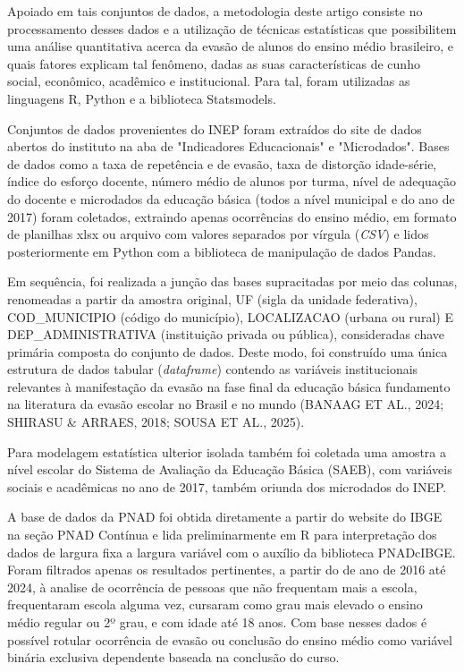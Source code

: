 \documentclass[english, spanish, brazilian]{RBIEarticle} %
\begin{document}
Apoiado em tais conjuntos de dados, a metodologia deste artigo consiste no processamento desses dados e a utilização de técnicas estatísticas que possibilitem uma análise quantitativa acerca da evasão de alunos do ensino médio brasileiro, e quais fatores explicam tal fenômeno, dadas as suas características de cunho social, econômico, acadêmico e institucional. Para tal, foram utilizadas as linguagens R, Python e a biblioteca Statsmodels.  

Conjuntos de dados provenientes do INEP foram extraídos do site de dados abertos do instituto na aba de "Indicadores Educacionais" e "Microdados". Bases de dados como a taxa de repetência e de evasão, taxa de distorção idade-série, índice do esforço docente, número médio de alunos por turma, nível de adequação do docente e microdados da educação básica (todos a nível municipal e do ano de 2017) foram coletados, extraindo apenas ocorrências do ensino médio, em formato de planilhas xlsx ou arquivo com valores separados por vírgula (\textit{CSV}) e lidos posteriormente em Python com a biblioteca de manipulação de dados Pandas.

Em sequência, foi realizada a junção das bases supracitadas por meio das colunas, renomeadas a partir da amostra original, UF (sigla da unidade federativa), COD\_MUNICIPIO (código do município), LOCALIZACAO (urbana ou rural) E DEP\_ADMINISTRATIVA (instituição privada ou pública), consideradas chave primária composta do conjunto de dados. Deste modo, foi construído uma única estrutura de dados tabular (\textit{dataframe}) contendo as variáveis institucionais relevantes à manifestação da evasão na fase final da educação básica fundamento na literatura da evasão escolar no Brasil e no mundo (BANAAG ET AL., 2024; SHIRASU \& ARRAES, 2018; SOUSA ET AL., 2025). 

Para modelagem estatística ulterior isolada também foi coletada uma amostra a nível escolar do Sistema de Avaliação da Educação Básica (SAEB), com variáveis sociais e acadêmicas no ano de 2017, também oriunda dos microdados do INEP.

A base de dados da PNAD foi obtida diretamente a partir do website do IBGE na seção PNAD Contínua e lida preliminarmente em R para interpretação dos dados de largura fixa a largura variável com o auxílio da biblioteca PNADcIBGE. Foram filtrados apenas os resultados pertinentes, a partir do de ano de 2016 até 2024, à analise de ocorrência de pessoas que não frequentam mais a escola, frequentaram escola alguma vez, cursaram como grau mais elevado o ensino médio regular ou 2º grau, e com idade até 18 anos. Com base nesses dados é possível rotular ocorrência de evasão ou conclusão do ensino médio como variável binária exclusiva dependente baseada na conclusão do curso.
\end{document}
